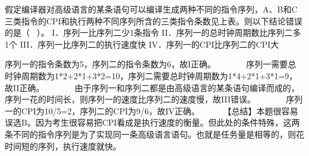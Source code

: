 假定编译器对高级语言的某条语句可以编译生成两种不同的指令序列，A、B和C三类指令的CPI和执行两种不同序列所含的三类指令条数见上表。则以下结论错误的是（
~）。 I．序列一比序列二少1条指令 II．序列一的总时钟周期数比序列二多1个
III．序列一比序列二的执行速度快 IV．序列一的CPI比序列二的CPI大
\par{}
\begin{solution}序列一的指令条数为5，序列二的指令条数为6，故I正确。 ~ ~ ~ ~
序列一需要总时钟周期数为1*2+2*1+3*2=10，序列二需要总时钟周期数为1*4+2*1+3*1=9，故II正确。
~ ~ ~ ~
由于序列一和序列二都是由高级语言的某条语句编译而成的，序列一花的时间长，则序列一的速度比序列二的速度慢，故III错误。
~ ~ ~ ~ 序列一的CPI为10/5=2，序列二的CPI为9/6，故IV正确。 ~ ~ ~
【总结】本题很容易误选B。因为考生很容易把CPI看成是执行速度的衡量。但此处的条件特殊，这两条不同的指令序列是为了实现同一条高级语言语句。也就是任务量是相等的，则花时间短的序列，执行速度就快。
\end{solution}
